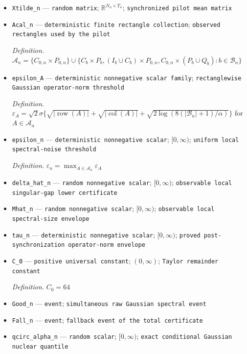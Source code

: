 \documentclass{article}
\begin{document}
\begin{itemize}
  \item \texttt{Xtilde\_\allowbreak{}n} --- \texttt{random matrix}; \(\mathbb R^{N_n\times T_n}\); \texttt{synchronized pilot mean matrix}
  \item \texttt{Acal\_\allowbreak{}n} --- \texttt{deterministic finite rectangle collection}; \texttt{observed rectangles used by the pilot}
  \par\smallskip\noindent\emph{Definition.} \(\mathcal A_n=\{C_{0,n}\times P_{0,n}\}\cup\{C_b\times P_b,(I_b\cup C_b)\times P_{0,n},C_{0,n}\times(P_b\cup Q_b):b\in\mathcal B_n\}\)
  \item \texttt{epsilon\_\allowbreak{}A} --- \texttt{deterministic nonnegative scalar family}; \texttt{rectanglewise Gaussian operator-\allowbreak{}norm threshold}
  \par\smallskip\noindent\emph{Definition.} \(\varepsilon_A=\sqrt{2}\sigma\{\sqrt{|\operatorname{row}(A)|}+\sqrt{|\operatorname{col}(A)|}+\sqrt{2\log(8(|\mathcal B_n|+1)/\alpha)}\}\) for \(A\in\mathcal A_n\)
  \item \texttt{epsilon\_\allowbreak{}n} --- \texttt{deterministic nonnegative scalar}; \([0,\infty)\); \texttt{uniform local spectral-\allowbreak{}noise threshold}
  \par\smallskip\noindent\emph{Definition.} \(\varepsilon_n=\max_{A\in\mathcal A_n}\varepsilon_A\)
  \item \texttt{delta\_\allowbreak{}hat\_\allowbreak{}n} --- \texttt{random nonnegative scalar}; \([0,\infty)\); \texttt{observable local singular-\allowbreak{}gap lower certificate}
  \item \texttt{Mhat\_\allowbreak{}n} --- \texttt{random nonnegative scalar}; \([0,\infty)\); \texttt{observable local spectral-\allowbreak{}size envelope}
  \item \texttt{tau\_\allowbreak{}n} --- \texttt{deterministic nonnegative scalar}; \([0,\infty)\); \texttt{proved post-\allowbreak{}synchronization operator-\allowbreak{}norm envelope}
  \item \texttt{C\_\allowbreak{}0} --- \texttt{positive universal constant}; \((0,\infty)\); \texttt{Taylor remainder constant}
  \par\smallskip\noindent\emph{Definition.} \(C_0=64\)
  \item \texttt{Good\_\allowbreak{}n} --- \texttt{event}; \texttt{simultaneous raw Gaussian spectral event}
  \item \texttt{Fall\_\allowbreak{}n} --- \texttt{event}; \texttt{fallback event of the total certificate}
  \item \texttt{qcirc\_\allowbreak{}alpha\_\allowbreak{}n} --- \texttt{random scalar}; \([0,\infty)\); \texttt{exact conditional Gaussian nuclear quantile}

\end{itemize}
\end{document}
